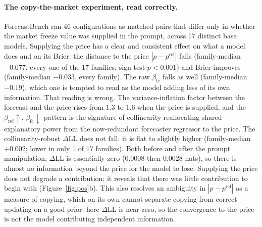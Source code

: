 \documentclass[11pt]{article}
\begin{document}
\paragraph{The copy-the-market experiment, read correctly.} ForecastBench ran 46 configurations as matched pairs that differ only in whether the market freeze value was supplied in the prompt, across 17 distinct base models. Supplying the price has a clear and consistent effect on what a model does and on its Brier: the distance to the price $|p-p^{\mathrm{ref}}|$ falls (family-median $-0.077$, every one of the 17 families, sign-test $p<0.001$) and Brier improves (family-median $-0.033$, every family). The raw $\beta_{\mathrm{fc}}$ falls as well (family-median $-0.19$), which one is tempted to read as the model adding less of its own information. That reading is wrong. The variance-inflation factor between the forecast and the price rises from $1.3$ to $1.6$ when the price is supplied, and the $\beta_{\mathrm{ref}}\!\uparrow$, $\beta_{\mathrm{fc}}\!\downarrow$ pattern is the signature of collinearity reallocating shared explanatory power from the now-redundant forecaster regressor to the price. The collinearity-robust $\Delta$LL does not fall: it is flat to slightly higher (family-median $+0.002$; lower in only $1$ of $17$ families). Both before and after the prompt manipulation, $\Delta$LL is essentially zero ($0.0008$ then $0.0028$ nats), so there is almost no information beyond the price for the model to lose. Supplying the price does not degrade a contribution; it reveals that there was little contribution to begin with (Figure~\ref{fig:pos}b). This also resolves an ambiguity in $|p-p^{\mathrm{ref}}|$ as a measure of copying, which on its own cannot separate copying from correct updating on a good prior: here $\Delta$LL is near zero, so the convergence to the price is not the model contributing independent information.
\end{document}
